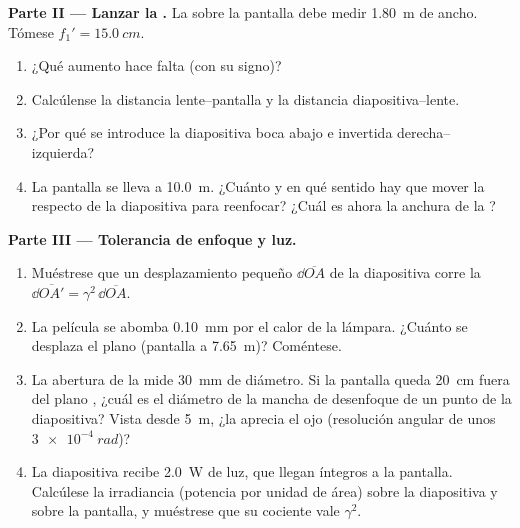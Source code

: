\begin{problem}
\medskip
\noindent\textbf{Parte II --- Lanzar la .}
La  sobre la pantalla debe medir \qty{1.80}{m} de ancho. Tómese
$f_1' = \qty{15.0}{cm}$.
\begin{enumerate}[resume]
  \item ¿Qué aumento hace falta (con su signo)?
  \item Calcúlense la distancia lente--pantalla y la distancia
        diapositiva--lente.
  \item ¿Por qué se introduce la diapositiva boca abajo e invertida
        derecha--izquierda?
  \item La pantalla se lleva a \qty{10.0}{m}. ¿Cuánto y en qué sentido hay
        que mover la  respecto de la diapositiva para reenfocar?
        ¿Cuál es ahora la anchura de la ?
\end{enumerate}

\medskip
\noindent\textbf{Parte III --- Tolerancia de enfoque y luz.}
\begin{enumerate}[resume]
  \item Muéstrese que un desplazamiento pequeño $\dd\overline{OA}$ de la
        diapositiva corre la  $\dd\overline{OA'} = \gamma^2\,\dd\overline{OA}$.
  \item La película se abomba \qty{0.10}{mm} por el calor de la lámpara.
        ¿Cuánto se desplaza el plano  (pantalla a \qty{7.65}{m})?
        Coméntese.
  \item La abertura de la  mide \qty{30}{mm} de diámetro. Si la
        pantalla queda \qty{20}{cm} fuera del plano , ¿cuál es el
        diámetro de la mancha de desenfoque de un punto de la
        diapositiva? Vista desde \qty{5}{m}, ¿la aprecia el ojo
        (resolución angular de unos $\qty{3e-4}{rad}$)?
  \item La diapositiva recibe \qty{2.0}{W} de luz, que llegan íntegros a
        la pantalla. Calcúlese la irradiancia (potencia por unidad de
        área) sobre la diapositiva y sobre la pantalla, y muéstrese que su
        cociente vale $\gamma^2$.
\end{enumerate}


\end{problem}
